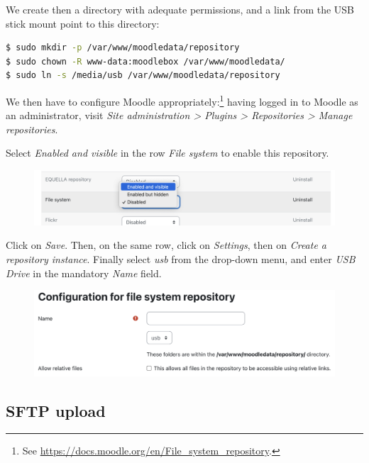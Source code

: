 \documentclass[12pt]{article}
\begin{document}
We create then a directory with adequate permissions, and a link from the USB stick mount point to this directory:
\begin{lstlisting}[language=bash]
$ sudo mkdir -p /var/www/moodledata/repository
$ sudo chown -R www-data:moodlebox /var/www/moodledata/
$ sudo ln -s /media/usb /var/www/moodledata/repository
\end{lstlisting}

We then have to configure Moodle appropriately:\footnote{See \url{https://docs.moodle.org/en/File_system_repository}.}
having logged in to Moodle as an administrator, visit \emph{Site administration > Plugins > Repositories > Manage repositories}.

Select \emph{Enabled and visible} in the row \emph{File system} to enable this repository.
\begin{figure}[!ht]
\begin{minipage}[b]{\linewidth}\centering
\includegraphics[width=13cm]{repo-filesystem-usb-1.png}
\end{minipage}
\end{figure}

Click on \emph{Save}.
Then, on the same row, click on \emph{Settings}, then on \emph{Create a repository instance}.
Finally select \emph{usb} from the drop-down menu, and enter \emph{USB Drive} in the mandatory \emph{Name} field.
\begin{figure}[!ht]
\begin{minipage}[b]{\linewidth}\centering
\includegraphics[width=13cm]{repo-filesystem-usb-2.png}
\end{minipage}
\end{figure}

\subsection{SFTP upload}
\end{document}
